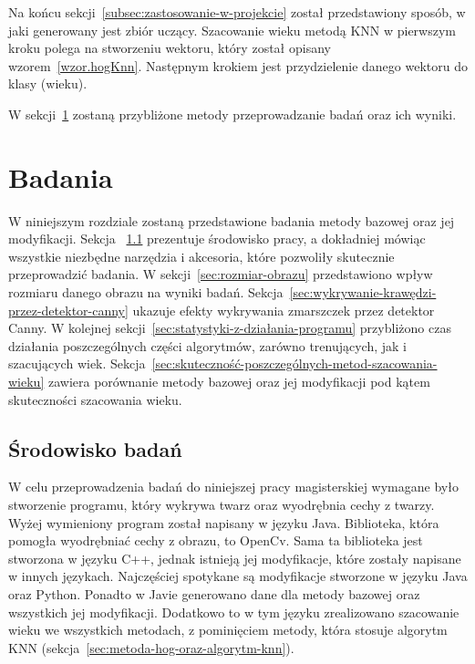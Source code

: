 \documentclass[a4paper,twoside,12pt]{book}
\begin{document}
    Na końcu sekcji~\ref{subsec:zastosowanie-w-projekcie} został przedstawiony sposób, w jaki generowany jest zbiór
    uczący.
    Szacowanie wieku metodą KNN w pierwszym kroku polega na stworzeniu wektoru, który został opisany
    wzorem~\ref{wzor.hogKnn}.
    Następnym krokiem jest przydzielenie danego wektoru do klasy (wieku).

    W sekcji~\ref{ch:badania} zostaną przybliżone metody przeprowadzanie badań oraz ich wyniki.

    \chapter{Badania}\label{ch:badania}
    W niniejszym rozdziale zostaną przedstawione badania metody bazowej oraz jej modyfikacji.
    Sekcja ~\ref{sec:środowisko-pracy} prezentuje środowisko pracy, a dokładniej mówiąc wszystkie
    niezbędne narzędzia i akcesoria, które pozwoliły skutecznie przeprowadzić badania.
    W sekcji~\ref{sec:rozmiar-obrazu} przedstawiono wpływ rozmiaru danego obrazu na wyniki badań.
    Sekcja~\ref{sec:wykrywanie-krawędzi-przez-detektor-canny} ukazuje efekty wykrywania zmarszczek przez detektor
    Canny. W kolejnej sekcji~\ref{sec:statystyki-z-działania-programu} przybliżono czas działania poszczególnych
    części algorytmów, zarówno trenujących, jak i szacujących wiek.
    Sekcja~\ref{sec:skuteczność-poszczególnych-metod-szacowania-wieku} zawiera porównanie metody bazowej oraz jej
    modyfikacji
    pod kątem skuteczności szacowania wieku.

    \section{Środowisko badań}\label{sec:środowisko-pracy}

    W celu przeprowadzenia badań do niniejszej pracy magisterskiej wymagane było stworzenie programu,
    który wykrywa twarz oraz wyodrębnia cechy z twarzy. Wyżej wymieniony program został napisany w języku Java.
    Biblioteka, która pomogła wyodrębniać cechy z obrazu, to OpenCv. Sama ta biblioteka jest stworzona w języku C++, jednak
    istnieją jej modyfikacje, które zostały napisane w innych językach. Najczęściej spotykane są modyfikacje
    stworzone w języku Java oraz Python. Ponadto w Javie generowano dane dla metody bazowej oraz wszystkich
    jej modyfikacji. Dodatkowo to w tym języku zrealizowano szacowanie wieku we wszystkich metodach, z
    pominięciem metody, która stosuje algorytm KNN (sekcja~\ref{sec:metoda-hog-oraz-algorytm-knn}).
\end{document}
